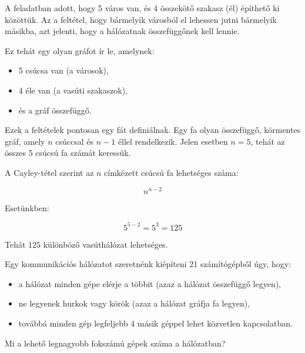 \begin{solution}
A feladatban adott, hogy 5 város van, és 4 összekötő szakasz (él)
építhető ki közöttük. Az a feltétel, hogy bármelyik városból el lehessen
jutni bármelyik másikba, azt jelenti, hogy a hálózatnak összefüggőnek
kell lennie.

Ez tehát egy olyan gráfot ír le, amelynek:
\begin{itemize}
\item 5 csúcsa van (a városok), 
\item 4 éle van (a vasúti szakaszok), 
\item és a gráf összefüggő. 
\end{itemize}
Ezek a feltételek pontosan egy fát definiálnak. Egy fa olyan összefüggő,
körmentes gráf, amely $n$ csúccsal és $n-1$ éllel rendelkezik. Jelen
esetben $n=5$, tehát az összes 5 csúcsú fa számát keressük.

A Cayley-tétel szerint az $n$ címkézett csúcsú fa lehetséges száma:

\[
n^{n-2}
\]

Esetünkben:

\[
5^{5-2}=5^{3}=125
\]

Tehát $125$ különböző vasúthálózat lehetséges. 
\end{solution}
\begin{extraproblem}
Egy kommunikációs hálózatot szeretnénk kiépíteni 21 számítógépből
úgy, hogy: 
\begin{itemize}
\item a hálózat minden gépe elérje a többit (azaz a hálózat összefüggő legyen), 
\item ne legyenek hurkok vagy körök (azaz a hálózat gráfja fa legyen), 
\item továbbá minden gép legfeljebb 4 másik géppel lehet közvetlen kapcsolatban. 
\end{itemize}
Mi a lehető legnagyobb fokszámú gépek száma a hálózatban? 
\end{extraproblem}

